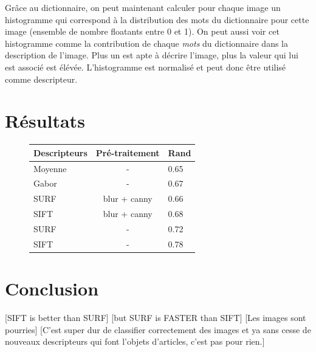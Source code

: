 \documentclass[12pt,a4paper,utf8x]{report}
\begin{document}
        Grâce au dictionnaire, on peut maintenant calculer pour chaque image un histogramme qui correspond à la distribution des mots du dictionnaire pour cette image (ensemble de nombre floatants entre 0 et 1). On peut aussi voir cet histogramme comme la contribution de chaque \textit{mots} du dictionnaire dans la description de l'image. Plus un  est apte à décrire l'image, plus la valeur qui lui est associé est élévée. L'histogramme est normalisé et peut donc être utilisé comme descripteur.


\chapter{Résultats}

\begin{figure}[!h]
      \centering
      \begin{tabular}{ | l | c | l | }
        \hline
        Descripteurs & Pré-traitement & Rand \\
        \hline
          Moyenne & -      & 0.65\\
          Gabor & -      & 0.67\\
          SURF  &   blur + canny & 0.66\\
          SIFT  & blur + canny & 0.68\\
          SURF  &   -        & 0.72\\
          SIFT  & -      & 0.78\\
        \hline  
      \end{tabular}
\end{figure}


\chapter{Conclusion}
    [SIFT is better than SURF]
    [but SURF is FASTER than SIFT]
    [Les images sont pourries]
    [C'est super dur de classifier correctement des images et ya sans cesse de nouveaux descripteurs qui font l'objets d'articles, c'est pas pour rien.]

  
\end{document}
